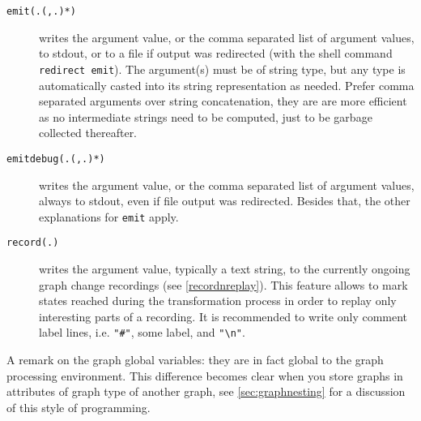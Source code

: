 \begin{description}
\item[\texttt{emit(.(,.)*)}] writes the argument value, or the comma separated list of argument values, to stdout, or to a file if output was redirected (with the shell command \texttt{redirect emit}). The argument(s) must be of string type, but any type is automatically casted into its string representation as needed. Prefer comma separated arguments over string concatenation, they are are more efficient as no intermediate strings need to be computed, just to be garbage collected thereafter.
\item[\texttt{emitdebug(.(,.)*)}] writes the argument value, or the comma separated list of argument values, always to stdout, even if file output was redirected. Besides that, the other explanations for \texttt{emit} apply.
\item[\texttt{record(.)}] writes the argument value, typically a text string, to the currently ongoing graph change recordings (see \ref{recordnreplay}).
This feature allows to mark states reached during the transformation process in order to replay only interesting parts of a recording.
It is recommended to write only comment label lines, i.e. \verb/"#"/, some label, and \verb/"\n"/.\end{description}

A remark on the graph global variables: they are in fact global to the graph processing environment.
This difference becomes clear when you store graphs in attributes of graph type of another graph, see \ref{sec:graphnesting} for a discussion of this style of programming.

